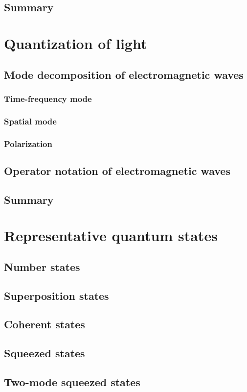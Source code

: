 \documentclass{book}
\begin{document}
\section{Summary}

\chapter{Quantization of light}
\section{Mode decomposition of electromagnetic waves}
\subsection{Time-frequency mode}
\subsection{Spatial mode}
\subsection{Polarization}
\section{Operator notation of electromagnetic waves}
\section{Summary}

\chapter{Representative quantum states}
\section{Number states}
\section{Superposition states}
\section{Coherent states}
\section{Squeezed states}
\section{Two-mode squeezed states}
\end{document}
